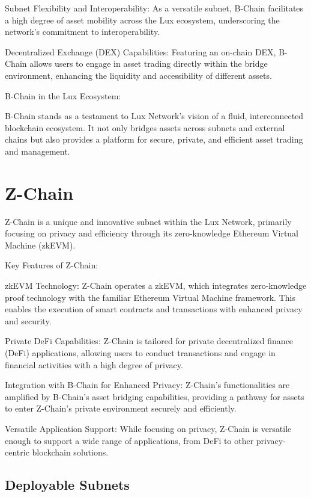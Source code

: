 \documentclass[11pt]{article}
\begin{document}
Subnet Flexibility and Interoperability: As a versatile subnet, B-Chain facilitates a high degree of asset mobility across the Lux ecosystem, underscoring the network's commitment to interoperability.


Decentralized Exchange (DEX) Capabilities: Featuring an on-chain DEX, B-Chain allows users to engage in asset trading directly within the bridge environment, enhancing the liquidity and accessibility of different assets.


B-Chain in the Lux Ecosystem:


B-Chain stands as a testament to Lux Network's vision of a fluid, interconnected blockchain ecosystem. It not only bridges assets across subnets and external chains but also provides a platform for secure, private, and efficient asset trading and management.


\section{Z-Chain}

Z-Chain is a unique and innovative subnet within the Lux Network, primarily focusing on privacy and efficiency through its zero-knowledge Ethereum Virtual Machine (zkEVM).


Key Features of Z-Chain:


zkEVM Technology: Z-Chain operates a zkEVM, which integrates zero-knowledge proof technology with the familiar Ethereum Virtual Machine framework. This enables the execution of smart contracts and transactions with enhanced privacy and security.


Private DeFi Capabilities: Z-Chain is tailored for private decentralized finance (DeFi) applications, allowing users to conduct transactions and engage in financial activities with a high degree of privacy.


Integration with B-Chain for Enhanced Privacy: Z-Chain's functionalities are amplified by B-Chain's asset bridging capabilities, providing a pathway for assets to enter Z-Chain's private environment securely and efficiently.


Versatile Application Support: While focusing on privacy, Z-Chain is versatile enough to support a wide range of applications, from DeFi to other privacy-centric blockchain solutions.


\subsection{Deployable Subnets}
\end{document}
